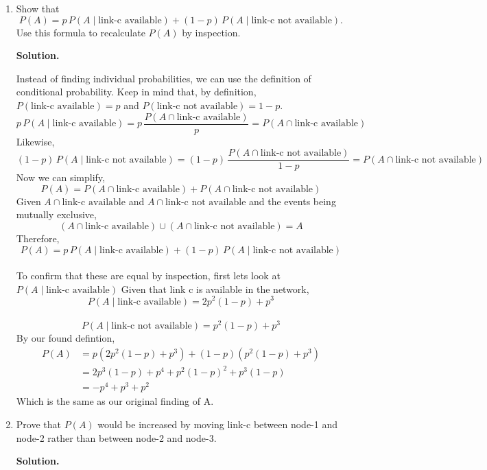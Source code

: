 \documentclass[11pt]{article}
\newenvironment{solution}{\par\noindent\textbf{Solution.}\ }{\par\vspace{6pt}}
\begin{document}
\begin{enumerate}[label=(\alph*)]
    \item Show that
    \[
        P(A) = p\, P(A \mid \text{link-c available}) + (1-p)\, P(A \mid \text{link-c not available}).
    \]
    Use this formula to recalculate $P(A)$ by inspection.

    \begin{solution}

        Instead of finding individual probabilities, we can use the definition of conditional probability.
        Keep in mind that, by definition, $P(\text{link-c available}) = p$ and $P(\text{link-c not available}) = 1 - p$.
        \[p\, P(A \mid \text{link-c available}) = p\, \frac{P(A \cap \text{link-c available})}{p} = P(A \cap \text{link-c available})\]
        Likewise,
        \[(1-p)\, P(A \mid \text{link-c not available}) = (1-p)\, \frac{P(A \cap \text{link-c not available})}{1-p} = P(A \cap \text{link-c not available})\]
        Now we can simplify,
        \[P(A) = P(A \cap \text{link-c available}) + P(A \cap \text{link-c not available})\]
        Given $A \cap \text{link-c available}$ and $A \cap \text{link-c not available}$ and the events being mutually exclusive,
        \[(A \cap \text{link-c available}) \cup (A \cap \text{link-c not available}) = A\]
        Therefore,
        \[P(A) = p\, P(A \mid \text{link-c available}) + (1-p)\, P(A \mid \text{link-c not available})\] \\
        To confirm that these are equal by inspection, first lets look at $P(A \mid \text{link-c available})$
        Given that link c is available in the network,
        \[P(A \mid \text{link-c available}) = 2p^2(1-p) + p^3\] \\
        \[P(A \mid \text{link-c not available}) = p^2(1-p) + p^3\]
        By our found defintion,
        \begin{align}
            P(A) &= p(2p^2(1-p) + p^3) + (1 - p)(p^2(1-p) + p^3) \\
            &= 2p^3(1-p) + p^4 + p^2(1-p)^2 + p^3(1-p) \\
            &= -p^4 + p^3 + p^2
        \end{align}
        Which is the same as our original finding of A.

    \end{solution}

    \item Prove that $P(A)$ would be increased by moving link-c between node-1 and node-2 rather than between node-2 and node-3.

    \begin{solution}


\end{solution}
\end{enumerate}
\end{document}
